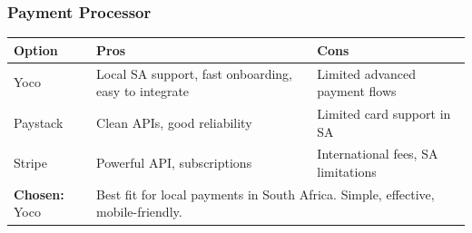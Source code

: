\documentclass[12pt]{article}
\begin{document}
\vspace{1em}

\subsubsection*{Payment Processor}
\begin{tabular}{|l|p{6cm}|p{6cm}|}
\hline
\textbf{Option} & \textbf{Pros} & \textbf{Cons} \\
\hline
Yoco & Local SA support, fast onboarding, easy to integrate & Limited advanced payment flows \\
\hline
Paystack & Clean APIs, good reliability & Limited card support in SA \\
\hline
Stripe & Powerful API, subscriptions & International fees, SA limitations \\
\hline
\textbf{Chosen:} Yoco & \multicolumn{2}{l|}{Best fit for local payments in South Africa. Simple, effective, mobile-friendly.} \\
\hline
\end{tabular}
\end{document}
